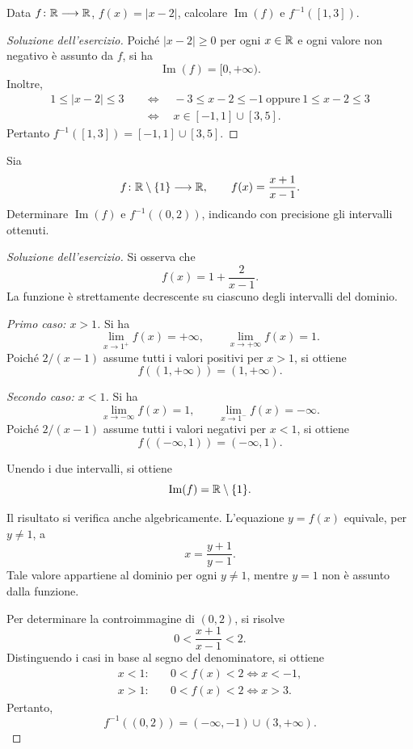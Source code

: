 \begin{exercise}
\label{ex:fondamenti-controimmagine-valore-assoluto}
Data $f\colon\mathbb{R}\longrightarrow\mathbb{R}$, $f(x)=|x-2|$,
calcolare $\operatorname{Im}(f)$ e $f^{-1}([1,3])$.
\end{exercise}
\begin{proof}[Soluzione dell'esercizio]
Poiché $|x-2|\ge0$ per ogni $x\in\mathbb{R}$ e ogni valore
non negativo è assunto da $f$, si ha
\[
  \operatorname{Im}(f)=[0,+\infty).
\]
Inoltre,
\[
\begin{aligned}
  1\le|x-2|\le3
    &\quad\Longleftrightarrow\quad
      -3\le x-2\le-1\ \text{oppure}\ 1\le x-2\le3\\
    &\quad\Longleftrightarrow\quad
      x\in[-1,1]\cup[3,5].
\end{aligned}
\]
Pertanto $f^{-1}([1,3])=[-1,1]\cup[3,5]$.
\end{proof}

\clearpage

\begin{exercise}
\label{ex:fondamenti-immagine-funzione-razionale}
Sia
\[
  f\colon\mathbb{R}\setminus\{1\}\longrightarrow\mathbb{R},
  \qquad f(x)=\frac{x+1}{x-1}.
\]
Determinare $\operatorname{Im}(f)$ e $f^{-1}((0,2))$,
indicando con precisione gli intervalli ottenuti.
\end{exercise}
\begin{proof}[Soluzione dell'esercizio]
Si osserva che
\[
  f(x)=1+\frac{2}{x-1}.
\]
La funzione è strettamente decrescente
su ciascuno degli intervalli del dominio.

\emph{Primo caso: \(x>1\).}
Si ha
\[
  \lim_{x\to1^+}f(x)=+\infty,
  \qquad
  \lim_{x\to+\infty}f(x)=1.
\]
Poiché $2/(x-1)$ assume tutti i valori positivi
per $x>1$, si ottiene
\[
  f((1,+\infty))=(1,+\infty).
\]

\emph{Secondo caso: \(x<1\).}
Si ha
\[
  \lim_{x\to-\infty}f(x)=1,
  \qquad
  \lim_{x\to1^-}f(x)=-\infty.
\]
Poiché $2/(x-1)$ assume tutti i valori negativi
per $x<1$, si ottiene
\[
  f((-\infty,1))=(-\infty,1).
\]

Unendo i due intervalli, si ottiene
\[
  \operatorname{Im}(f)=\mathbb{R}\setminus\{1\}.
\]

Il risultato si verifica anche algebricamente.
L'equazione \(y=f(x)\) equivale, per \(y\ne1\), a
\[
  x=\frac{y+1}{y-1}.
\]
Tale valore appartiene al dominio per ogni \(y\ne1\),
mentre \(y=1\) non è assunto dalla funzione.

Per determinare la controimmagine di \((0,2)\), si risolve
\[
  0<\frac{x+1}{x-1}<2.
\]
Distinguendo i casi in base al segno del denominatore,
si ottiene
\[
\begin{aligned}
  x<1:\quad &0<f(x)<2
    \Longleftrightarrow x<-1,\\
  x>1:\quad &0<f(x)<2
    \Longleftrightarrow x>3.
\end{aligned}
\]
Pertanto,
\[
  f^{-1}((0,2))
  =(-\infty,-1)\cup(3,+\infty).
\]
\end{proof}

